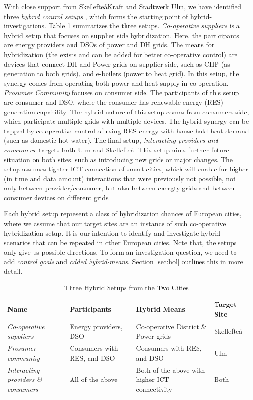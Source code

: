 \documentclass[conference]{IEEEtran}
\begin{document}
With close support from Skellefte\aa Kraft and Stadtwerk Ulm, we have
identified three {\em hybrid control setups} , which forms the
starting point of hybrid-investigations.   
Table \ref{tab:1} summarizes the three setups. {\em Co-operative
  suppliers} is a hybrid setup that focuses on supplier side
hybridization. Here, the participants are energy providers and DSOs of 
power and DH grids. The means for hybridization (the exists and can be
added for better co-operative control) are devices that connect DH and 
Power grids on supplier side, such as CHP (as generation to both
grids), and e-boilers (power to heat grid). In this setup, the synergy
comes from operating both power and heat supply in co-operation. 
{\em Prosumer Community} focuses on consumer side. The participants of
this setup are consumer and DSO, where the consumer has renewable
energy (RES) generation capability. The hybrid nature of this setup
comes from consumers side, which participate multiple grids with
multiple devices. The hybrid synergy can be tapped by co-operative
control of using RES energy with house-hold heat demand (such as
domestic hot water). 
The final setup, {\em Interacting providers and consumers}, targets
both Ulm and Skellefte\aa. This setup aims further future situation on
both sites, such as introducing new grids or major changes. The
setup assumes tighter ICT connection of smart cities, which will
enable far higher (in time and data amount) interactions that were
previously not possible, not only between provider/consumer, but also
between energty grids and between consumer devices on different grids.   

Each hybrid setup represent a class of hybridization chances of 
European cities, where we assume that our target sites are an instance
of such co-operative hybridization setup. It is our intention to
identify and investigate hybrid scenarios that can be repeated in
other European cities.  
Note that, the setups only give us possible directions. To form an
investigation question, we need to add {\em control goals} and {\em
added hybrid-means}. Section \ref{sec:hol} outlines this in more
detail.  

\begin{table}[t]
  \centering
  \caption{Three Hybrid Setups from the Two Cities}
  \label{tab:1}
  \begin{tabular}{|p{1.5cm}|p{2cm}|p{2.5cm}|p{1cm}|}
    \hline
    Name & Participants & Hybrid Means & Target Site \\ \hline
    {\em Co-operative suppliers} & Energy providers, DSO & Co-operative District \& Power grids & Skellefte\aa \\ \hline 
    {\em Prosumer community} & Consumers with RES, and DSO & Consumers with RES, and DSO & Ulm \\ \hline 
    {\em Interacting providers \& consumers} & All of the above & Both of the above with higher ICT connectivity & Both\\ \hline  
  \end{tabular}
\end{table}
\end{document}
